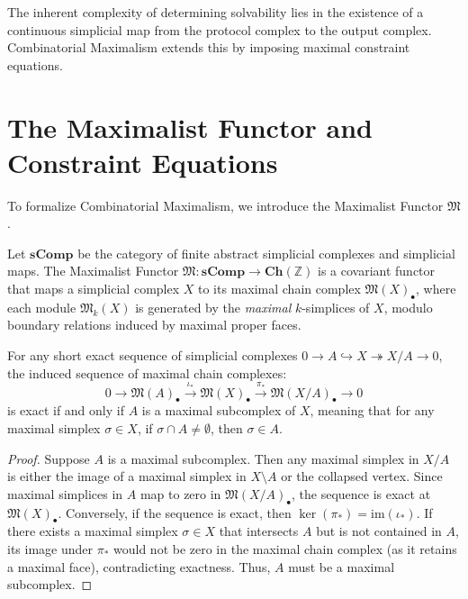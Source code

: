 The inherent complexity of determining solvability lies in the existence of a continuous simplicial map from the protocol complex to the output complex. Combinatorial Maximalism extends this by imposing maximal constraint equations.

\section{The Maximalist Functor and Constraint Equations}

To formalize Combinatorial Maximalism, we introduce the Maximalist Functor $\mathfrak{M}$.

\begin{definition}
Let $\mathbf{sComp}$ be the category of finite abstract simplicial complexes and simplicial maps. The Maximalist Functor $\mathfrak{M}: \mathbf{sComp} \to \mathbf{Ch}(\mathbb{Z})$ is a covariant functor that maps a simplicial complex $X$ to its maximal chain complex $\mathfrak{M}(X)_{\bullet}$, where each module $\mathfrak{M}_k(X)$ is generated by the \textit{maximal} $k$-simplices of $X$, modulo boundary relations induced by maximal proper faces.
\end{definition}

\begin{lemma}
For any short exact sequence of simplicial complexes $0 \to A \hookrightarrow X \twoheadrightarrow X/A \to 0$, the induced sequence of maximal chain complexes:
\[
0 \to \mathfrak{M}(A)_{\bullet} \xrightarrow{\iota_*} \mathfrak{M}(X)_{\bullet} \xrightarrow{\pi_*} \mathfrak{M}(X/A)_{\bullet} \to 0
\]
is exact if and only if $A$ is a maximal subcomplex of $X$, meaning that for any maximal simplex $\sigma \in X$, if $\sigma \cap A \neq \emptyset$, then $\sigma \in A$.
\end{lemma}

\begin{proof}
Suppose $A$ is a maximal subcomplex. Then any maximal simplex in $X/A$ is either the image of a maximal simplex in $X \setminus A$ or the collapsed vertex. Since maximal simplices in $A$ map to zero in $\mathfrak{M}(X/A)_{\bullet}$, the sequence is exact at $\mathfrak{M}(X)_{\bullet}$.
Conversely, if the sequence is exact, then $\ker(\pi_*) = \text{im}(\iota_*)$. If there exists a maximal simplex $\sigma \in X$ that intersects $A$ but is not contained in $A$, its image under $\pi_*$ would not be zero in the maximal chain complex (as it retains a maximal face), contradicting exactness. Thus, $A$ must be a maximal subcomplex.
\end{proof}

